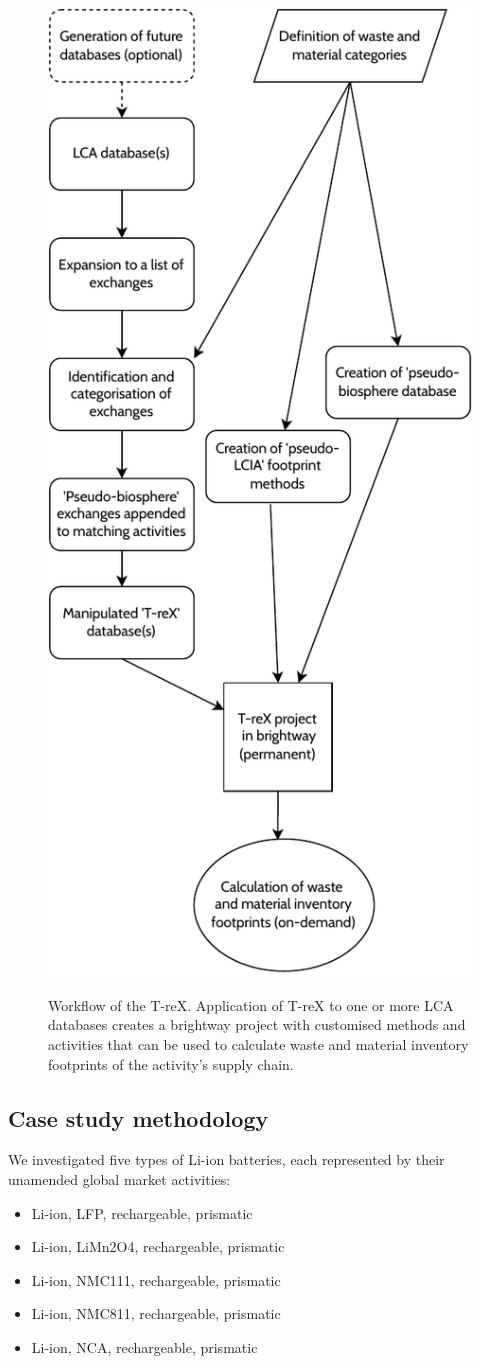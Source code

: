 \begin{figure}[H]
    \centering
    \caption{Workflow of the T-reX. Application of T-reX to one or more LCA databases creates a brightway project with customised methods and activities that can be used to calculate waste and material inventory footprints of the activity's supply chain.}
    \includegraphics[width=0.5\linewidth]{figures/T-reX_method.pdf}
    \label{fig:methods-flowchart}
\end{figure}


\subsection{Case study methodology}\label{sec:method-case_study}

We investigated five types of Li-ion batteries, each represented by their unamended global market activities:
\begin{itemize}[itemsep=0pt]
    \item Li-ion, LFP, rechargeable, prismatic
    \item Li-ion, LiMn2O4, rechargeable, prismatic
    \item Li-ion, NMC111, rechargeable, prismatic
    \item Li-ion, NMC811, rechargeable, prismatic
    \item Li-ion, NCA, rechargeable, prismatic
\end{itemize}

